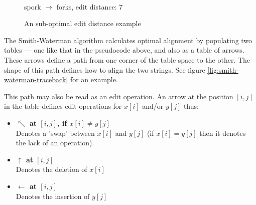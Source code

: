 \begin{figure}[h]
  \centering   
  \\
  \vspace{3 mm}
  spork $\rightarrow$ forks, edit distance: 7
  \caption{An sub-optimal edit distance example}
  \label{fig:fork-spork-subopt}
\end{figure}

The Smith-Waterman algorithm calculates optimal alignment by
populating two tables --- one like that in the pseudocode
above, and also as a table of arrows. These arrows define a
path from one corner of the table space to the other. The
shape of this path defines how to align the two
strings.\cite{Smith1981} See figure
\ref{fig:smith-waterman-traceback} for an example.

This path may also be read as an edit operation. An arrow at the
position $[i,j]$ in the table defines edit operations for $x[i]$
and/or $y[j]$ thus:
\begin{itemize}
\item \textbf{$\nwarrow$ at $[i,j]$, if $x[i] \neq y[j]$} \\ Denotes a
  'swap' between $x[i]$ and $y[j]$ (if $x[i] = y[j]$ then it denotes
  the lack of an operation).
\item \textbf{$\uparrow$ at $[i,j]$}\\Denotes the deletion of $x[i]$
\item \textbf{$\leftarrow$ at $[i,j]$}\\Denotes the insertion of
  $y[j]$
\end{itemize}

